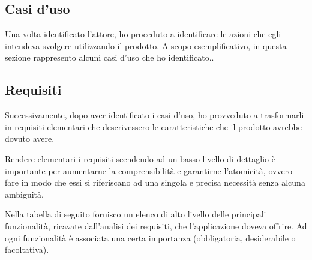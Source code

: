 	\subsection{Casi d'uso}
		Una volta identificato l'attore, ho proceduto a identificare le azioni che egli intendeva svolgere utilizzando il prodotto. A scopo esemplificativo, in questa sezione rappresento alcuni casi d'uso che ho identificato..
		

		    
	
	\subsection{Requisiti}
		\label{sec:requisiti}
		Successivamente, dopo aver identificato i casi d'uso, ho provveduto a trasformarli in requisiti elementari che descrivessero le caratteristiche che il prodotto avrebbe dovuto avere.
		
		Rendere elementari i requisiti scendendo ad un basso livello di dettaglio è importante per aumentarne la comprensibilità e garantirne l'atomicità, ovvero fare in modo che essi si riferiscano ad una singola e precisa necessità senza alcuna ambiguità.
		
		Nella tabella di seguito fornisco un elenco di alto livello delle principali funzionalità, ricavate dall'analisi dei requisiti, che l'applicazione doveva offrire. Ad ogni funzionalità è associata una certa importanza (obbligatoria, desiderabile o facoltativa).
%		
		  
		

